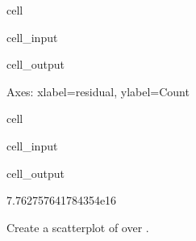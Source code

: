\documentclass[letterpaper,10pt,english]{sphinxmanual}
\begin{document}
\begin{sphinxuseclass}{cell}
\begin{sphinxuseclass}{cell_input}
\begin{sphinxVerbatim}[commandchars=\\\{\}]
  
\end{sphinxVerbatim}

\end{sphinxuseclass}
\begin{sphinxuseclass}{cell_output}
\begin{sphinxVerbatim}[commandchars=\\\{\}]
\PYGZlt{}Axes: xlabel=\PYGZsq{}residual\PYGZsq{}, ylabel=\PYGZsq{}Count\PYGZsq{}\PYGZgt{}
\end{sphinxVerbatim}

\noindent{}

\end{sphinxuseclass}
\end{sphinxuseclass}
\begin{sphinxuseclass}{cell}
\begin{sphinxuseclass}{cell_input}
\begin{sphinxVerbatim}[commandchars=\\\{\}]
\PYG{p}{[}\PYG{p}{]}
\end{sphinxVerbatim}

\end{sphinxuseclass}
\begin{sphinxuseclass}{cell_output}
\begin{sphinxVerbatim}[commandchars=\\\{\}]
7.762757641784354e\PYGZhy{}16
\end{sphinxVerbatim}

\end{sphinxuseclass}
\end{sphinxuseclass}
\sphinxAtStartPar
Create a scatterplot of  over .
\end{document}
